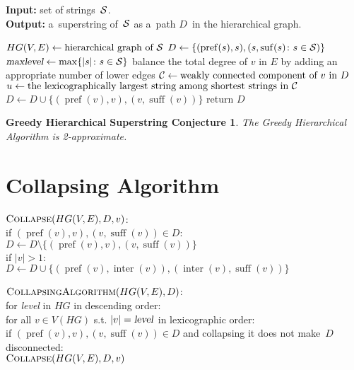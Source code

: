 \documentclass[11pt,letterpaper]{article}
\DeclareMathOperator{\pref}{pref}
\DeclareMathOperator{\suff}{suff}
\DeclareMathOperator{\inter}{inter}
\begin{document}
\begin{algorithm}
\caption{Greedy Hierarchical Algorithm}
\hspace*{\algorithmicindent} \textbf{Input:} set of strings~${\cal S}$.\\
\hspace*{\algorithmicindent} \textbf{Output:} a~superstring of~${\cal S}$ as a~path $D$~in the hierarchical graph.
\begin{algorithmic}[1]
\State $HG(V,E) \gets \text{hierarchical graph of ${\cal S}$}$ 
\State $D \gets \{(\operatorname{pref}(s), s), (s, \operatorname{suf}(s) \colon s \in {\cal S})\}$\\
$\textsl{maxlevel} \gets \max\{|s| \colon s \in {\cal S}\}$
\State balance the total degree of $v$ in $E$ by adding an appropriate number of lower edges
\Else
\State ${\cal C} \gets \text{weakly connected component of $v$ in $D$}$
\State $u \gets \text{the lexicographically largest string among shortest strings in ${\cal C}$}$
\State $D \gets D \cup \{(\pref(v), v), (v, \suff(v))\}$
\EndIf
\EndIf
\EndFor
\State return $D$
\end{algorithmic}
\end{algorithm}

\newtheorem*{ghcc}{Greedy Hierarchical Superstring Conjecture}
\begin{ghcc}
The Greedy Hierarchical Algorithm is 2-approximate.
\end{ghcc}

\section{Collapsing Algorithm}
\noindent $\text{\sc Collapse}(HG(V,E), D, v)$:\\
if $(\pref(v), v), (v, \suff(v)) \in D$:\\
\null\quad $D \gets D \setminus \{(\pref(v), v), (v, \suff(v))\}$\\
\null\quad if $|v| > 1$:\\
\null\quad\quad $D \gets D \cup \{(\pref(v), \inter(v)), (\inter(v), \suff(v))\}$

\bigskip

\noindent $\text{\sc CollapsingAlgorithm}(HG(V,E), D)$:\\
for \textsl{level} in $HG$ in descending order:\\
\null\quad for all $v \in V(HG)$ s.t. $|v|=\text{\textsl{level}}$ in lexicographic order:\\
\null\quad\quad if $(\pref(v), v), (v, \suff(v)) \in D$ and collapsing it does not make~$D$ disconnected:\\
\null\quad\quad\quad $\text{\sc Collapse}(HG(V,E), D, v)$
\end{document}
